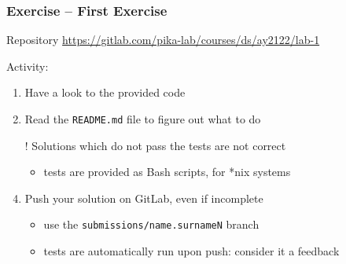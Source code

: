 \documentclass{beamer}\mode<presentation>{\usetheme{AMSBolognaFC}}
\newcommand{\labN}{1}
\newcommand{\labGroup}{https://gitlab.com/pika-lab/courses/ds/ay2122}
\newcommand{\labRepo}{\labGroup/lab-\labN}
\begin{document}
\begin{frame}[allowframebreaks]
	\frametitle{Exercise \currentExercise{} -- First Exercise}

	\begin{block}{Repository}\centering
		\url{\labRepo}
	\end{block}

	\bigskip

	Activity:
	\medskip
	\begin{enumerate}
		\item Have a look to the provided code

		\medskip

		\item Read the \texttt{README.md} file to figure out what to do

		\framebreak

		\item[!] Solutions which do not pass the tests are not correct
		\begin{itemize}
			\item tests are provided as Bash scripts, for *nix systems
		\end{itemize}

		\medskip

		\item Push your solution on GitLab, \alert{even if incomplete}
		\begin{itemize}
			\item use the \texttt{submissions/\alert{name.surnameN}} branch
			\item tests are automatically run upon push: consider it a feedback
		\end{itemize}

	\end{enumerate}

\end{frame}

\section*{}
\frame{\titlepage}

\end{document}
